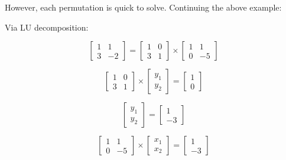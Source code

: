 \documentclass[a4paper, 12pt]{article}
\begin{document}
However, each permutation is quick to solve. Continuing the above example:

\vspace{1.5em}

\begin{minipage}{0.4\textwidth}
	\label{LU_Decomp}
	\begin{center}
		Via LU decomposition:
	\end{center}
	\begin{equation*}
	\begin{bmatrix}
	1 & 1 \\
	3 & -2
	\end{bmatrix}
	=
	\begin{bmatrix}
	1 & 0 \\
	3 & 1
	\end{bmatrix}
	\times
	\begin{bmatrix}
	1 & 1\\
	0 & -5
	\end{bmatrix}
	\end{equation*}
	
	\begin{equation*}
	\begin{bmatrix}
	1 & 0 \\
	3 & 1
	\end{bmatrix}
	\times
	\begin{bmatrix}
	y_1 \\
	y_2
	\end{bmatrix}
	=
	\begin{bmatrix}
	1 \\
	0
	\end{bmatrix}
	\end{equation*}
	
	\begin{equation*}
	\begin{bmatrix}
	y_1 \\
	y_2
	\end{bmatrix}
	=
	\begin{bmatrix}
	1 \\
	-3
	\end{bmatrix}
	\end{equation*}
	
	\begin{equation*}
	\begin{bmatrix}
	1 & 1 \\
	0 & -5
	\end{bmatrix}
	\times
	\begin{bmatrix}
	x_1 \\
	x_2
	\end{bmatrix}
	=
	\begin{bmatrix}
	1 \\
	-3
	\end{bmatrix}
	\end{equation*}
	

\end{minipage}
\end{document}
